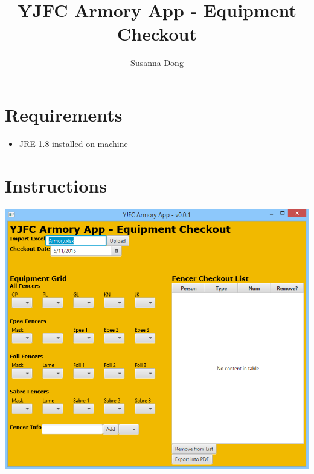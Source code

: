 \documentclass[]{article}
\title{YJFC Armory App - Equipment Checkout}
\author{Susanna Dong}
\begin{document}
\maketitle

\section{Requirements}
\begin{itemize}
\item JRE 1.8 installed on machine
\end{itemize}

\section{Instructions}
\includegraphics[scale=0.7]{screen.png}
\end{document}
